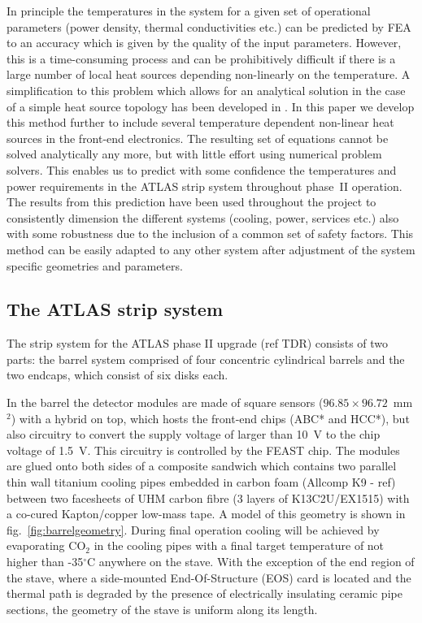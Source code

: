 In principle the temperatures in the system for a given set of operational parameters (power density, thermal conductivities etc.) can be predicted by FEA to an accuracy which is given by the quality of the input parameters. However, this is a time-consuming process and can be prohibitively difficult if there is a large number of local heat sources depending non-linearly on the temperature. A simplification to this problem which allows for an analytical solution in the case of a simple heat source topology has been developed in \cite{Beck:2010zzd}. In this paper we develop this method further to include several temperature dependent non-linear heat sources in the front-end electronics. The resulting set of equations cannot be solved analytically any more, but with little effort using numerical problem solvers. This enables us to predict with some confidence the temperatures and power requirements in the ATLAS strip system throughout phase~II operation. The results from this prediction have been used throughout the project to consistently dimension the different systems (cooling, power, services etc.) also with some robustness due to the inclusion of a common set of safety factors. This method can be easily adapted to any other system after adjustment of the system specific geometries and parameters.

\subsection{The ATLAS strip system}
The strip system for the ATLAS phase II upgrade (ref TDR) consists of two parts: the barrel system comprised of four concentric cylindrical barrels and the two endcaps, which consist of six disks each.

In the barrel the detector modules are made of square sensors ($96.85\times 96.72$~mm$^2$) with a hybrid on top, which hosts the front-end chips (ABC* and HCC*), but also circuitry to convert the supply voltage of larger than 10~V to the chip voltage of 1.5~V. This circuitry is controlled by the FEAST chip. The modules are glued onto both sides of a composite sandwich which contains two parallel thin wall titanium cooling pipes embedded in carbon foam (Allcomp K9 - ref)  between two facesheets of UHM carbon fibre (3 layers of K13C2U/EX1515) with a co-cured Kapton/copper low-mass tape. A model of this geometry is shown in fig.~\ref{fig:barrelgeometry}. During final operation cooling will be achieved by evaporating CO$_2$ in the cooling pipes with a final target temperature of not higher than -35$^\circ$C anywhere on the stave. With the exception of the end region of the stave, where a side-mounted End-Of-Structure (EOS) card is located and the thermal path is degraded by the presence of electrically insulating ceramic pipe sections, the geometry of the stave is uniform along its length. 

